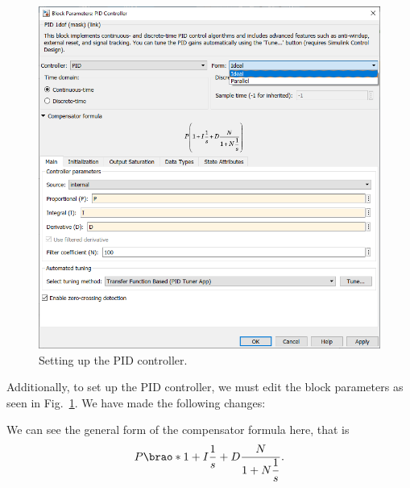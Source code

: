 \documentclass[12pt]{article}
\DeclarePairedDelimiter\brao()%
\newcommand\matlab{matlab}
\begin{document}
\begin{figure}
    \centering
    \includegraphics[width=\linewidth]{img/task00_010_setting_up_PID_controller.png}
    \caption{Setting up the PID controller.}
    \label{fig:pid controller block parameters}
\end{figure}

Additionally, to set up the PID controller, we must edit the block parameters as seen in Fig.~\ref{fig:pid controller block parameters}. We have made the following changes:

We can see the general form of the compensator formula here, that is
\begin{equation}
    P\brao*{1 + I\frac1s + D\frac{N}{\displaystyle1 + N\frac1s}}.
\end{equation}
\end{document}
